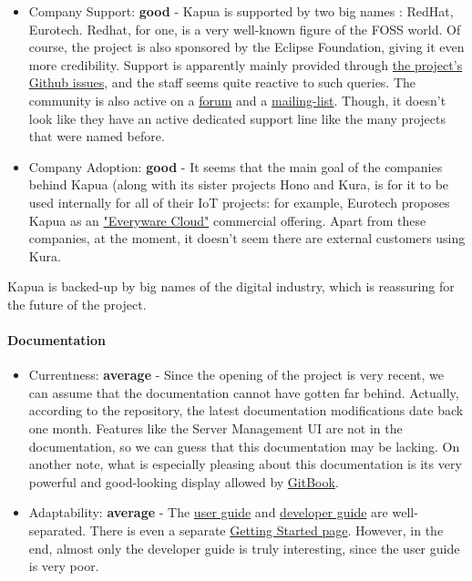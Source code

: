 \documentclass{article}
\begin{document}
\begin{itemize}
\item Company Support: \textbf{good} - Kapua is supported by two big names : RedHat, Eurotech. Redhat, for one, is a very well-known figure of the FOSS world. Of course, the project is also sponsored by the Eclipse Foundation, giving it even more credibility. Support is apparently mainly provided through \href{https://github.com/eclipse/kapua/issues}{the project's Github issues}, and the staff seems quite reactive to such queries. The community is also active on a \href{https://www.eclipse.org/forums/index.php/f/340/}{forum} and a \href{https://dev.eclipse.org/mailman/listinfo/kapua-dev}{mailing-list}. Though, it doesn't look like they have an active dedicated support line like the many projects that were named before.
\item Company Adoption: \textbf{good} - It seems that the main goal of the companies behind Kapua (along with its sister projects Hono and Kura, is for it to be used internally for all of their IoT projects: for example, Eurotech proposes Kapua as an \href{https://www.eurotech.com/en/products/software+services/everyware+device+cloud}{"Everyware Cloud"} commercial offering. Apart from these companies, at the moment, it doesn't seem there are external customers using Kura.
\end{itemize}

Kapua is backed-up by big names of the digital industry, which is reassuring for the future of the project.

\paragraph{Documentation}

\begin{itemize}
\item Currentness: \textbf{average} - Since the opening of the project is very recent, we can assume that the documentation cannot have gotten far behind. Actually, according to the repository, the latest documentation modifications date back one month. Features like the Server Management UI are not in the documentation, so we can guess that this documentation may be lacking. On another note, what is especially pleasing about this documentation is its very powerful and good-looking display allowed by \href{https://www.gitbook.com/}{GitBook}.
\item Adaptability: \textbf{average} - The \href{http://download.eclipse.org/kapua/docs/develop/user-manual/en/}{user guide} and \href{http://download.eclipse.org/kapua/docs/develop/developer-guide/en/}{developer guide} are well-separated. There is even a separate \href{https://www.eclipse.org/kapua/getting-started.php}{Getting Started page}. However, in the end, almost only the developer guide is truly interesting, since the user guide is very poor.
\end{itemize}
\end{document}
